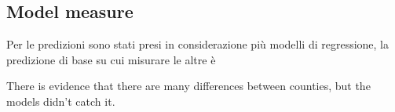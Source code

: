 \subsection{Model measure}

    
Per le predizioni sono stati presi in considerazione più modelli di regressione, la predizione di base su cui misurare le altre è 

There is evidence that there are many differences between counties, but the models didn't catch it.